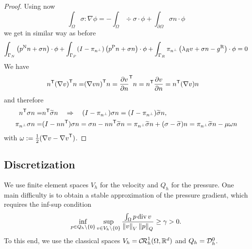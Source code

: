 %
\begin{proof}
Using now
%
%
\begin{equation}\label{eq:Stokes:ippsigma}
\int_{\Omega} \sigma:\nabla\phi = -\int_{\Omega} \div \sigma\cdot \phi+ \int_{\partial \Omega} \sigma n\cdot \phi
\end{equation}
%
we get in similar way as before
%
\begin{align*}
\int_{\Gamma_N} \left( p^{\rm N} n + \sigma n\right)\cdot\phi 
+ \int_{\Gamma_P}  (I-\pi_{n^{\perp}})\left( p^{\rm P} n+ \sigma n\right)\cdot\phi
+ \int_{\Gamma_R} \pi_{n^{\perp}}\left ( \lambda_R v + \sigma n -g^{\rm R} \right)\cdot\phi =0
\end{align*}
%
We have 
%
\begin{align*}
{n}^{\mathsf{T}}{(\nabla v)}^{\mathsf{T}} n =& {(\nabla v n)}^{\mathsf{T}} n = {\frac{\partial v}{\partial n}}^{\mathsf{T}} n= {n}^{\mathsf{T}}\frac{\partial v}{\partial n}=
{n}^{\mathsf{T}}(\nabla v) n
\end{align*}
%
and therefore
%
\begin{align*}
{n}^{\mathsf{T}}\sigma n =& {n}^{\mathsf{T}}\widetilde{\sigma} n\quad\Rightarrow\quad (I-\pi_{n^{\perp}})\sigma n= (I-\pi_{n^{\perp}})\widetilde{\sigma} n,\\ 
\pi_{n^{\perp}} \sigma n =& (I-n{n}^{\mathsf{T}})\sigma n = \sigma n - n{n}^{\mathsf{T}}\widetilde{\sigma} n = \pi_{n^{\perp}} \widetilde{\sigma} n  + (\sigma-\widetilde{\sigma}) n = \pi_{n^{\perp}} \widetilde{\sigma} n  - \mu \omega n
\end{align*}
%
with $\omega := \frac{1}{2}(\nabla v-{\nabla v}^{\mathsf{T}})$.
\end{proof}
%
%
\subsection{Discretization}\label{subsec:}
%
We use finite element spaces $V_h$ for the velocity and $Q_h$ for the pressure. One main difficulty is to obtain a stable approximation of the pressure gradient, which requires the inf-sup condition
%
\begin{equation}\label{eq:stokes:infsupgrad}
\inf_{p\in Q_h\setminus\left\{0\right\}}\sup_{v\in V_h\setminus\left\{0\right\}} \frac{\int_{\Omega}p\operatorname{div} v}{\left\|v\right\|_V\left\|p\right\|_Q} \ge \gamma >0.
\end{equation}
%
To this end, we use the classical spaces $V_h = \mathcal{C\!R}^1_h(\Omega,\mathbb R^d)$ and $Q_h=\mathcal{D}_h^0$.
%
